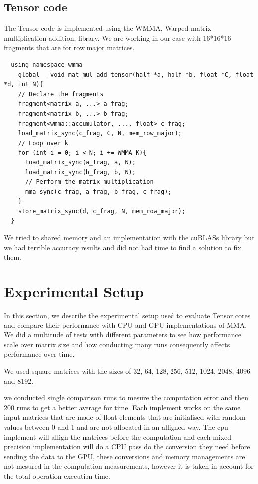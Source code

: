 \documentclass[conference]{IEEEtran}
\begin{document}
  
  \subsection{Tensor code}\label{sec:TensorCode}
  The Tensor code is implemented using the WMMA,  Warped matrix multiplication addition,
  library. We are working in our case with 16*16*16 fragments that are for row major matrices.
  \begin{lstlisting}
  using namespace wmma
  __global__ void mat_mul_add_tensor(half *a, half *b, float *C, float *d, int N){
    // Declare the fragments
    fragment<matrix_a, ...> a_frag;
    fragment<matrix_b, ...> b_frag;
    fragment<wmma::accumulator, ..., float> c_frag;
    load_matrix_sync(c_frag, C, N, mem_row_major);
    // Loop over k
    for (int i = 0; i < N; i += WMMA_K){
      load_matrix_sync(a_frag, a, N);
      load_matrix_sync(b_frag, b, N);
      // Perform the matrix multiplication
      mma_sync(c_frag, a_frag, b_frag, c_frag);
    }
    store_matrix_sync(d, c_frag, N, mem_row_major);
  }
  \end{lstlisting}

  We tried to shared memory and an implementation with the cuBLASs library but we had terrible 
  accuracy results and did not had time to find a solution to fix them. 

  \section{Experimental Setup}\label{sec:experimental-setup}
  
  In this section, we describe the experimental setup used to evaluate 
  Tensor cores and compare their performance with CPU and GPU implementations of MMA.
  We did a multitude of tests with different parameters to see how performance scale over matrix size
  and how conducting many runs consequently affects performance over time.

  We used square matrices with the sizes of 32, 64, 128, 256, 512, 1024, 2048, 4096 and 8192.

  we conducted single comparison runs to mesure the computation error and then 200 runs to get a better average for time.
  Each implement works on the same input matrices that are made of float elements that are initialised with random values between 0 and 1
  and are not allocated in an alligned way. The cpu implement will allign the matrices before the computation and each mixed precision implementation will do a CPU pass do the conversion they need
  before sending the data to the GPU, these conversions and memory managements are not mesured in the computation 
  measurements, however it is taken in account for the total operation execution time.
\end{document}
